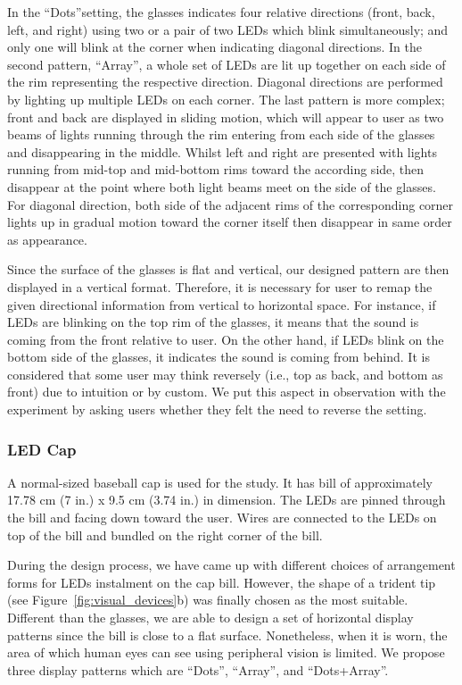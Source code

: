 \documentclass{sigchi}
\begin{document}
In the \textquotedblleft Dots\textquotedblright setting, the glasses indicates four relative directions (front, back, left, and right) using two or a pair of two LEDs which blink simultaneously; and only one will blink at the corner when indicating diagonal directions. In the second pattern, \textquotedblleft  Array\textquotedblright, a whole set of LEDs are lit up together on each side of the rim representing the respective direction. Diagonal directions are performed by lighting up multiple LEDs on each corner. The last pattern is more complex; front and back are displayed in sliding motion, which will appear to user as two beams of lights running through the rim entering from each side of the glasses and disappearing in the middle. Whilst left and right are presented with lights running from mid-top and mid-bottom rims toward the according side, then disappear at the point where both light beams meet on the side of the glasses. For diagonal direction, both side of the adjacent rims of the corresponding corner lights up in gradual motion toward the corner itself then disappear in same order as appearance.

Since the surface of the glasses is flat and vertical, our designed pattern are then displayed in a vertical format. Therefore, it is necessary for user to remap the given directional information from vertical to horizontal space. For instance, if LEDs are blinking on the top rim of the glasses, it means that the sound is coming from the front relative to user. On the other hand, if LEDs blink on the bottom side of the glasses, it indicates the sound is coming from behind. It is considered that some user may think reversely (i.e., top as back, and bottom as front) due to intuition or by custom. We put this aspect in observation with the experiment by asking users whether they felt the need to reverse the setting.


\subsubsection{LED Cap}
A normal-sized baseball cap is used for the study. It has bill of approximately 17.78 cm (7 in.) x 9.5 cm (3.74 in.) in dimension. The LEDs are pinned through the bill and facing down toward the user. Wires are connected to the LEDs on top of the bill and bundled on the right corner of the bill.

During the design process, we have came up with different choices of arrangement forms for LEDs instalment on the cap bill. However, the shape of a trident tip (see Figure~\ref{fig:visual_devices}b) was finally chosen as the most suitable. Different than the glasses, we are able to design a set of horizontal display patterns since the bill is close to a flat surface. Nonetheless, when it is worn, the area of which human eyes can see using peripheral vision is limited. We propose three display patterns which are \textquotedblleft Dots\textquotedblright, \textquotedblleft Array\textquotedblright, and \textquotedblleft Dots+Array\textquotedblright.
\end{document}
